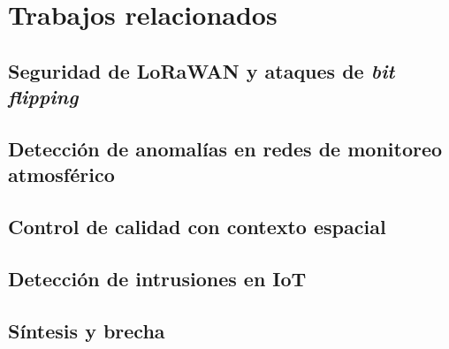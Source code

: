 \chapter{Trabajos relacionados}
\label{cap:trabajos}


\section{Seguridad de LoRaWAN y ataques de \textit{bit flipping}}
\label{sec:rel-lorawan}

\section{Detección de anomalías en redes de monitoreo atmosférico}
\label{sec:rel-calidad-aire}

\section{Control de calidad con contexto espacial}
\label{sec:rel-espacial}

\section{Detección de intrusiones en IoT}
\label{sec:rel-ids}

\section{Síntesis y brecha}
\label{sec:rel-brecha}
